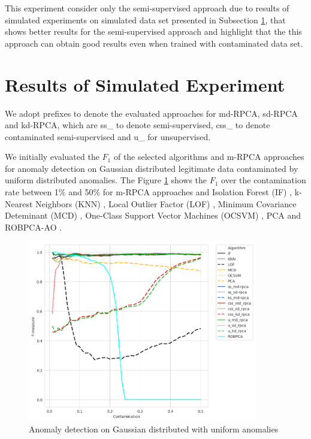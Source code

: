 This experiment consider only the semi-supervised approach due to results of simulated experiments on simulated data set presented in Subsection \ref{sec:4_simulated_result}, that shows better results for the semi-supervised approach and highlight that the this approach can obtain good results even when trained with contaminated data set.


\section{Results of Simulated Experiment}
\label{sec:4_simulated_result}

We adopt prefixes to denote the evaluated approaches for md-RPCA, sd-RPCA and kd-RPCA, which are ss\_ to denote semi-supervised, css\_ to denote contaminated semi-supervised and u\_ for unsupervised.

We initially evaluated the $F_1$ of the selected algorithms and m-RPCA approaches for anomaly detection on Gaussian distributed legitimate data contaminated by uniform distributed anomalies. The Figure \ref{fig:4.10} shows the $F_1$ over the contamination rate between 1\% and 50\% for m-RPCA approaches and Isolation Forest (IF) \cite{liu2008isolation}, k-Nearest Neighbors (KNN) \cite{angiulli2002fast}, Local Outlier Factor (LOF) \cite{breunig2000lof}, Minimum Covariance Deteminant (MCD) \cite{rousseeuw1999fastmcd}, One-Class Support Vector Machines (OCSVM) \cite{scholkopf2001estimating}, PCA \cite{shyu2003novel} and ROBPCA-AO \cite{hubert2009robustskewed}.

\begin{figure}[h!]
	\centering
	\includegraphics[width=10cm]{figures/ch4/gaussian_f1_contamination.png}
	\caption{Anomaly detection on Gaussian distributed with uniform anomalies}
	\label{fig:4.10}
\end{figure}

